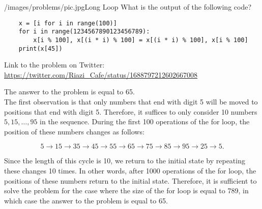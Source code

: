 \begin{problem}{/images/problems/pic.jpg}{Long Loop}
	What is the output of the following code?

	\begin{verbatim}
	x = [i for i in range(100)]
	for i in range(1234567890123456789):
		x[i % 100], x[(i * i) % 100] = x[(i * i) % 100], x[i % 100]
	print(x[45])
	\end{verbatim}

Link to the problem on Twitter:  \url{https://twitter.com/Riazi_Cafe/status/1688797212602667008}
\end{problem}
\begin{solution}
The answer to the problem is equal to 65.\\[0.2cm]

The first observation is that only numbers that end with digit 5 will be moved to positions that end with digit 5. Therefore, it suffices to only consider 10 numbers $5, 15, \ldots, 95$ in the sequence.
During the first 100 operations of the for loop, the position of these numbers changes as follows:

$$5 \rightarrow 15 \rightarrow 35 \rightarrow 45 \rightarrow 55 \rightarrow 65 \rightarrow 75 \rightarrow 85 \rightarrow 95 \rightarrow 25 \rightarrow 5.$$

Since the length of this cycle is 10, we return to the initial state by repeating these changes 10 times. In other words, after 1000 operations of the for loop, the positions of these numbers return to the initial state. Therefore, it is sufficient to solve the problem for the case where the size of the for loop is equal to 789, in which case the answer to the problem is equal to 65.




\end{solution}